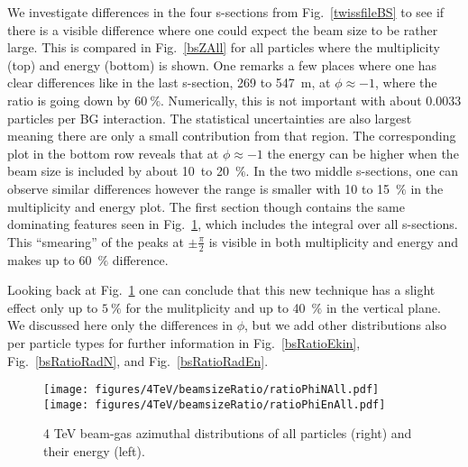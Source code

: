 We investigate differences in the four s-sections from Fig.~\ref{twissfileBS} to see if there is a visible difference where one could expect the beam size to be rather large. This is compared in Fig.~\ref{bsZAll} for all particles where the multiplicity (top) and energy (bottom) is shown. One remarks a few places where one has clear differences like in the last s-section, 269 to 547~m, at $\phi \approx -1$, where the ratio is going down by $60~\%$. Numerically, this is not important with about 0.0033 particles per BG interaction. The statistical uncertainties are also largest meaning there are only a small contribution from that region. The corresponding plot in the bottom row reveals that at $\phi \approx -1$ the energy can be higher when the beam size is included by about 10~to 20~$\%$.
In the two middle s-sections, one can observe similar differences however the range is smaller with 10 to 15~$\%$ in the multiplicity and energy plot. The first section though contains the same dominating features seen in Fig.~\ref{bsRatioPhiAll}, which includes the integral over all s-sections. This ``smearing'' of the peaks at $\pm \frac{\pi}{2}$ is visible in both multiplicity and energy and makes up to 60~$\%$ difference.

Looking back at Fig.~\ref{bsRatioPhiAll} one can conclude that this new technique has a slight effect only up to $5~\%$ for the mulitplicity and up to 40~$\%$ in the vertical plane. We discussed here only the differences in $\phi$, but we add other distributions also per particle types for further information in Fig.~\ref{bsRatioEkin}, Fig.~\ref{bsRatioRadN}, and Fig.~\ref{bsRatioRadEn}.

\begin{figure}%
\begin{center}
  \texttt{[image: figures/4TeV/beamsizeRatio/ratioPhiNAll.pdf]}
  \texttt{[image: figures/4TeV/beamsizeRatio/ratioPhiEnAll.pdf]}
\end{center}
\vspace{-0.6cm}
 \caption{4 TeV beam-gas azimuthal distributions of all particles (right) and their energy (left).
  \label{bsRatioPhiAll}} 
\end{figure}


